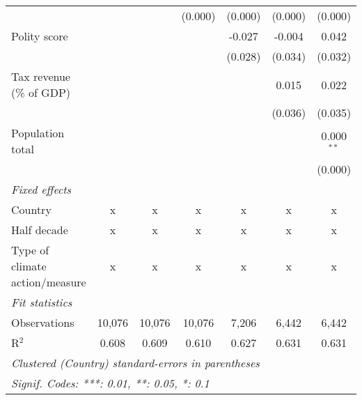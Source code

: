 \begin{tabular}{lcccccc}
                                                                                &         &                & (0.000)        & (0.000)        & (0.000)        & (0.000)\\   
   Polity score                                                                 &         &                &                & -0.027         & -0.004         & 0.042\\   
                                                                                &         &                &                & (0.028)        & (0.034)        & (0.032)\\   
   Tax revenue (\% of GDP)                                                      &         &                &                &                & 0.015          & 0.022\\   
                                                                                &         &                &                &                & (0.036)        & (0.035)\\   
   Population total                                                             &         &                &                &                &                & 0.000$^{**}$\\   
                                                                                &         &                &                &                &                & (0.000)\\   
   \emph{Fixed effects}\\
   Country                                                                      & x       & x              & x              & x              & x              & x\\  
   Half decade                                                                  & x       & x              & x              & x              & x              & x\\  
   Type of climate action/measure                                               & x       & x              & x              & x              & x              & x\\  
   \midrule \emph{Fit statistics}\\
   Observations                                                                 & 10,076  & 10,076         & 10,076         & 7,206          & 6,442          & 6,442\\  
   R$^2$                                                                        & 0.608   & 0.609          & 0.610          & 0.627          & 0.631          & 0.631\\  
   \midrule
   \multicolumn{7}{l}{\emph{Clustered (Country) standard-errors in parentheses}}\\
   \multicolumn{7}{l}{\emph{Signif. Codes: ***: 0.01, **: 0.05, *: 0.1}}\\
\end{tabular}
\par\endgroup


